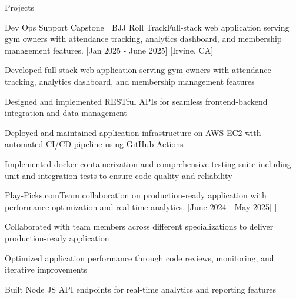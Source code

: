 \documentclass{resume} %
\begin{document}



\begin{rSection}{Projects}
    \begin{rProjects}{Dev Ops Support Capstone | BJJ Roll Track}{Full-stack web application serving gym owners with attendance tracking, analytics dashboard, and membership management features.}
        [Jan 2025 - June 2025]
        [Irvine, CA]
        \begin{rItemize}
            \item Developed full-stack web application serving gym owners with attendance tracking, analytics dashboard, and membership management features
            \item Designed and implemented RESTful APIs for seamless frontend-backend integration and data management
            \item Deployed and maintained application infrastructure on AWS EC2 with automated CI/CD pipeline using GitHub Actions
            \item Implemented docker containerization and comprehensive testing suite including unit and integration tests to ensure code quality and reliability
        \end{rItemize}
    \end{rProjects}

    \begin{rProjects}{Play-Picks.com}{Team collaboration on production-ready application with performance optimization and real-time analytics.}
        [June 2024 - May 2025]
        []
        \begin{rItemize}
            \item Collaborated with team members across different specializations to deliver production-ready application
            \item Optimized application performance through code reviews, monitoring, and iterative improvements
            \item Built Node JS API endpoints for real-time analytics and reporting features
        \end{rItemize}
    \end{rProjects}


\end{rSection}
\end{document}
